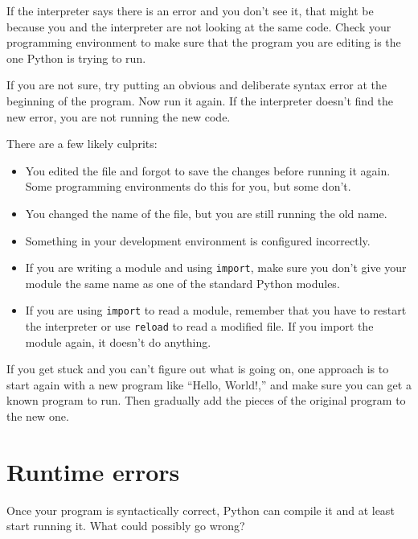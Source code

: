 \documentclass[10pt]{book}
\begin{document}
If the interpreter says there is an error and you don't see it, that
might be because you and the interpreter are not looking at the same
code.  Check your programming environment to make sure that the
program you are editing is the one Python is trying to run.

If you are not sure, try putting an obvious and deliberate syntax
error at the beginning of the program.  Now run it again.  If the
interpreter doesn't find the new error, you are not running the
new code.

There are a few likely culprits:

\begin{itemize}

\item You edited the file and forgot to save the changes before
running it again.  Some programming environments do this
for you, but some don't.

\item You changed the name of the file, but you are still running
the old name.

\item Something in your development environment is configured
incorrectly.

\item If you are writing a module and using {\tt import},
make sure you don't give your module the same name as one
of the standard Python modules.


\item If you are using {\tt import} to read a module, remember
that you have to restart the interpreter or use {\tt reload}
to read a modified file.  If you import the module again, it
doesn't do anything.

\end{itemize}

If you get stuck and you can't figure out what is going on, one
approach is to start again with a new program like ``Hello, World!,''
and make sure you can get a known program to run.  Then gradually add
the pieces of the original program to the new one.


\section{Runtime errors}

Once your program is syntactically correct,
Python can compile it and at least start running it.  What could
possibly go wrong?
\end{document}
